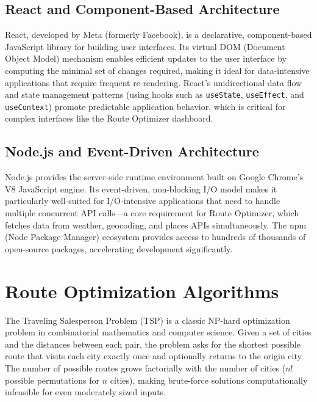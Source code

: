 \subsection{React and Component-Based Architecture}
React, developed by Meta (formerly Facebook), is a declarative, component-based JavaScript library for building user interfaces. Its virtual DOM (Document Object Model) mechanism enables efficient updates to the user interface by computing the minimal set of changes required, making it ideal for data-intensive applications that require frequent re-rendering. React's unidirectional data flow and state management patterns (using hooks such as \texttt{useState}, \texttt{useEffect}, and \texttt{useContext}) promote predictable application behavior, which is critical for complex interfaces like the Route Optimizer dashboard.

\subsection{Node.js and Event-Driven Architecture}
Node.js provides the server-side runtime environment built on Google Chrome's V8 JavaScript engine. Its event-driven, non-blocking I/O model makes it particularly well-suited for I/O-intensive applications that need to handle multiple concurrent API calls---a core requirement for Route Optimizer, which fetches data from weather, geocoding, and places APIs simultaneously. The npm (Node Package Manager) ecosystem provides access to hundreds of thousands of open-source packages, accelerating development significantly.

\section{Route Optimization Algorithms}
The Traveling Salesperson Problem (TSP) is a classic NP-hard optimization problem in combinatorial mathematics and computer science. Given a set of cities and the distances between each pair, the problem asks for the shortest possible route that visits each city exactly once and optionally returns to the origin city. The number of possible routes grows factorially with the number of cities ($n!$ possible permutations for $n$ cities), making brute-force solutions computationally infeasible for even moderately sized inputs.


